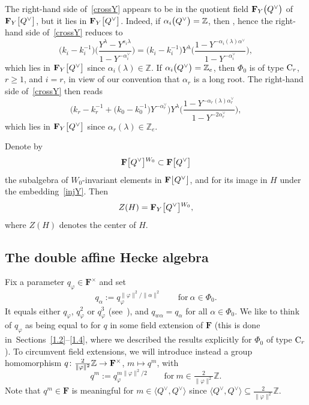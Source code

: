 The right-hand side of~\eqref{crossY} appears to be in the quotient field $\mathbf{F}_Y\smash{\bigl(Q^\vee\bigr)}$ of $\mathbf{F}_Y\smash{\bigl[Q^\vee\bigr]}$, but it lies
in $\mathbf{F}_Y\smash{\bigl[Q^\vee\bigr]}$. Indeed, if $\alpha_i\smash{\bigl(Q^\vee\bigr)}=\mathbb{Z}$, then
, hence the right-hand side of~\eqref{crossY} reduces to
\[
\bigl(k_i-k_i^{-1}\bigr)\biggl(\frac{Y^\lambda-Y^{s_i\lambda}}{1-Y^{-\alpha_i^\vee}}\biggr)=
\bigl(k_i-k_i^{-1}\bigr)Y^\lambda\biggl(\frac{1-Y^{-\alpha_i(\lambda)\alpha^\vee}}{1-Y^{-\alpha_i^\vee}}\biggr),
\]
which lies in $\mathbf{F}_Y\smash{\bigl[Q^\vee\bigr]}$ since $\alpha_i(\lambda)\in\mathbb{Z}$. If $\alpha_i\smash{\bigl(Q^\vee\bigr)}=\mathbb{Z}_e$, then $\Phi_0$ is of type ${\rm C}_r$, $r\geq 1$,
and $i=r$, in view of our convention that $\alpha_r$ is a long root.
The right-hand side of~\eqref{crossY} then reads
\[
\bigl(k_r-k_r^{-1}+\bigl(k_0-k_0^{-1}\bigr)Y^{-\alpha_r^\vee}\bigr)Y^\lambda\biggl(\frac{1-Y^{-\alpha_r(\lambda)\alpha_r^\vee}}{1-Y^{-2\alpha_r^\vee}}\biggr),
\]
which lies in $\mathbf{F}_Y\smash{\bigl[Q^\vee\bigr]}$ since $\alpha_r(\lambda)\in \mathbb{Z}_e$.

Denote by
\[
\mathbf{F}\smash{\bigl[Q^\vee\bigr]}^{W_0}\subset\mathbf{F}\smash{\bigl[Q^\vee\bigr]}
\]
the subalgebra of $W_0$-invariant elements in $\mathbf{F}\smash{\bigl[Q^\vee\bigr]}$, and  for its image in $H$ under the embedding~\eqref{injY}. Then
\[
Z(H)=\mathbf{F}_Y\smash{\bigl[Q^\vee\bigr]}^{W_0},
\]
where $Z(H)$ denotes the center of $H$.

\subsection{The double affine Hecke algebra}\label{2.5}
Fix a parameter $q_\varphi\in\mathbf{F}^\times$ and set
\[
q_\alpha:=q_\varphi^{\|\varphi\|^2/\|\alpha\|^2}\qquad \text{for}\ \alpha\in\Phi_0.
\]
It equals either $q_\varphi$, $q_\varphi^2$ or $q_\varphi^3$ (see~\cite[Section~9.4, Table~1]{Hu}), and $q_{w\alpha}=q_\alpha$ for all $\alpha\in\Phi_0$.
We like to think of $q_\varphi$ as being equal to  for $q$ in some field extension of $\mathbf{F}$ (this is done in~Sections~\ref{1.2}--\ref{1.4}, where we described the results explicitly for $\Phi_0$ of type ${\rm C}_r$).
To circumvent field extensions, we will introduce instead a group homomorphism $q\colon \smash{\frac{2}{\|\varphi\|^2}}\mathbb{Z}\rightarrow\mathbf{F}^\times$, $m\mapsto q^m$, with
\begin{equation*}%
q^{m}:=q_\varphi^{m\|\varphi\|^2/2}\qquad \text{for}\ m\in\tfrac{2}{\|\varphi\|^2}\mathbb{Z}.
\end{equation*}
Note that $q^m\in\mathbf{F}$ is meaningful for $m\in \bigl\langle Q^\vee, Q^\vee\bigr\rangle$ since
$\bigl\langle Q^\vee, Q^\vee\bigr\rangle\subseteq\frac{2}{\|\varphi\|^2}\mathbb{Z}$.

